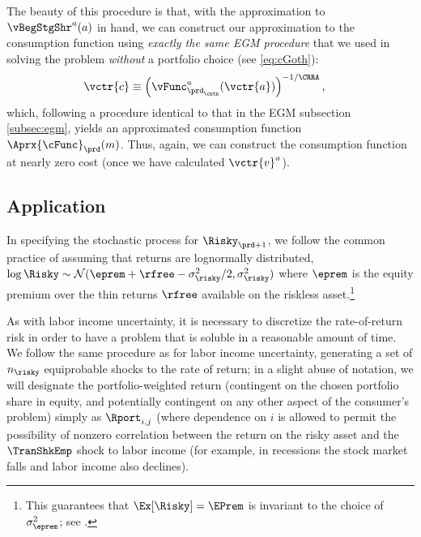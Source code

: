 \documentclass[\econtexRoot/SolvingMicroDSOPs]{subfiles}
\begin{document}
The beauty of this procedure is that, with the approximation to $\vBegStgShr^{a}(a)$ in hand, we can construct our approximation to the consumption function using \emph{exactly the same EGM procedure} that we used in solving the problem \emph{without} a portfolio choice (see \eqref{eq:cGoth}):
\begin{equation}\begin{gathered}\begin{aligned}
      \vctr{c}  & \equiv  \left(\vFunc^{a}_{\prd_\cntn}(\vctr{a})\right)^{-1/\CRRA} \label{eq:cVecPort},
    \end{aligned}\end{gathered}\end{equation}
which, following a procedure identical to that in the EGM subsection \ref{subsec:egm}, yields an approximated consumption function $\Aprx{\cFunc}_{\prd}({m})$.  Thus, again, we can construct the consumption function at nearly zero cost (once we have calculated $\vctr{v}^{a}$).

\subsection{Application}\label{subsec:MCApplication}

In specifying the stochastic process for $\Risky_{\prd+1}$, we follow the common practice of assuming that returns are lognormally distributed, $\log \Risky \sim \mathcal{N}(\eprem+\rfree-\sigma^{2}_{\risky}/2,\sigma^{2}_{\risky})$ where $\eprem$ is the equity premium over the thin returns $\rfree$ available on the riskless asset.\footnote{This guarantees that $\Ex[\Risky] = \EPrem$ is invariant to the choice of $\sigma^{2}_{\eprem}$; see .}

As with labor income uncertainty, it is necessary to discretize the rate-of-return risk in order to have a problem that is soluble in a reasonable amount of time.  We follow the same procedure as for labor income uncertainty, generating a set of $n_{\risky}$ equiprobable shocks to the rate of return; in a slight abuse of notation, we will designate the portfolio-weighted return (contingent on the chosen portfolio share in equity, and potentially contingent on any other aspect of the consumer's problem) simply as $\Rport_{i,j}$ (where dependence on $i$ is allowed to permit the possibility of nonzero correlation between the return on the risky asset and the $\TranShkEmp$ shock to labor income (for example, in recessions the stock market falls and labor income also declines).
\end{document}
